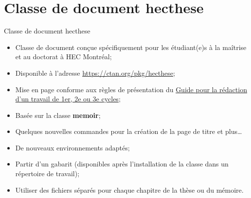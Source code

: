 
\section{Classe de document hecthese}

\begin{frame}{Classe de document hecthese}
	\begin{itemize}
		\item Classe de document conçue spécifiquement pour les étudiant(e)s à la maîtrise
			et au doctorat à HEC Montréal;
		\item Disponible à l'adresse \href{https://ctan.org/pkg/hecthese}{https://ctan.org/pkg/hecthese};
		\item Mise en page conforme aux règles de présentation du 
			\href{http://www.hec.ca/qualitecomm/caf/guide-redaction-travail-cycles.pdf}{%
			Guide pour la rédaction d’un travail de 1er, 2e ou 3e cycles};
		\item Basée sur la classe \textbf{memoir};
		\item Quelques nouvelles commandes pour la création de la page de titre et plus\ldots
		\item De nouveaux environnements adaptés;
		\item Partir d’un gabarit (disponibles après l’installation de la classe dans un répertoire de travail);
		\item Utiliser des fichiers séparés pour chaque chapitre de la thèse ou du mémoire.
	\end{itemize}
\end{frame}